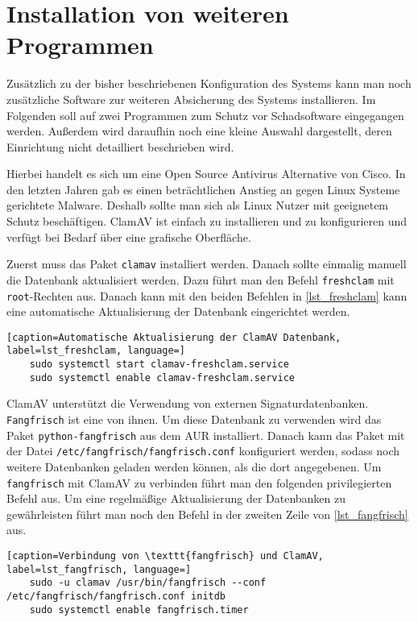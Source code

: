 \section{Installation von weiteren Programmen}
Zusätzlich zu der bisher beschriebenen Konfiguration des Systems kann man noch zusätzliche Software zur weiteren Absicherung des Systems installieren. Im Folgenden soll auf zwei Programmen zum Schutz vor Schadsoftware eingegangen werden. Außerdem wird daraufhin noch eine kleine Auswahl dargestellt, deren Einrichtung nicht detailliert beschrieben wird.

Hierbei handelt es sich um eine Open Source Antivirus Alternative von Cisco. In den letzten Jahren gab es einen beträchtlichen Anstieg an gegen Linux Systeme gerichtete Malware.\cite{LinuxMalwareRise2017} Deshalb sollte man sich als Linux Nutzer mit geeignetem Schutz beschäftigen. ClamAV ist einfach zu installieren und zu konfigurieren und verfügt bei Bedarf über eine grafische Oberfläche.

Zuerst muss das Paket \texttt{clamav} installiert werden. Danach sollte einmalig manuell die Datenbank aktualisiert werden. Dazu führt man den Befehl \texttt{freshclam} mit \texttt{root}-Rechten aus. Danach kann mit den beiden Befehlen in \autoref{lst_freshclam} kann eine automatische Aktualisierung der Datenbank eingerichtet werden.\cite{ClamAVArchWiki}

\begin{lstlisting}[caption=Automatische Aktualisierung der ClamAV Datenbank, label=lst_freshclam, language=]
	sudo systemctl start clamav-freshclam.service
	sudo systemctl enable clamav-freshclam.service
\end{lstlisting}

ClamAV unterstützt die Verwendung von externen Signaturdatenbanken. \texttt{Fangfrisch} ist eine von ihnen. Um diese Datenbank zu verwenden wird das Paket \texttt{python-fangfrisch} aus dem \ac{AUR} installiert. Danach kann das Paket mit der Datei \texttt{/etc/fangfrisch/fangfrisch.conf} konfiguriert werden, sodass noch weitere Datenbanken geladen werden können, als die dort angegebenen.\cite{Fangfrisch2020} Um \texttt{fangfrisch} mit ClamAV zu verbinden führt man den folgenden privilegierten Befehl aus. Um eine regelmäßige Aktualisierung der Datenbanken zu gewährleisten führt man noch den Befehl in der zweiten Zeile von \autoref{lst_fangfrisch} aus.

\begin{lstlisting}[caption=Verbindung von \texttt{fangfrisch} und ClamAV, label=lst_fangfrisch, language=]
	sudo -u clamav /usr/bin/fangfrisch --conf /etc/fangfrisch/fangfrisch.conf initdb
	sudo systemctl enable fangfrisch.timer
\end{lstlisting}

